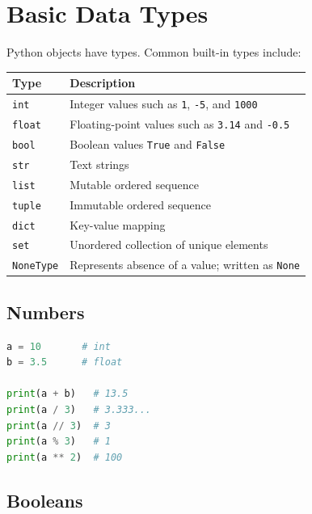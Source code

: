 \documentclass[12pt,oneside]{book}
\numberwithin{equation}{section}
\theoremstyle{definition}
\theoremstyle{plain}
\theoremstyle{remark}
\begin{document}
\section{Basic Data Types}

Python objects have types. Common built-in types include:

\begin{center}
\begin{xltabular}{\textwidth}{>{\raggedright\arraybackslash}p{0.25\textwidth}
>{\raggedright\arraybackslash}X}
\toprule
Type & Description \\
\midrule
\texttt{int} & Integer values such as \texttt{1}, \texttt{-5}, and \texttt{1000} \\

\texttt{float} & Floating-point values such as \texttt{3.14} and \texttt{-0.5} \\

\texttt{bool} & Boolean values \texttt{True} and \texttt{False} \\

\texttt{str} & Text strings \\

\texttt{list} & Mutable ordered sequence \\

\texttt{tuple} & Immutable ordered sequence \\

\texttt{dict} & Key-value mapping \\

\texttt{set} & Unordered collection of unique elements \\

\texttt{NoneType} & Represents absence of a value; written as \texttt{None} \\
\bottomrule
\end{xltabular}
\end{center}

\subsection{Numbers}

\begin{lstlisting}[language=Python]
a = 10       # int
b = 3.5      # float

print(a + b)   # 13.5
print(a / 3)   # 3.333...
print(a // 3)  # 3
print(a % 3)   # 1
print(a ** 2)  # 100
\end{lstlisting}

\subsection{Booleans}
\end{document}
